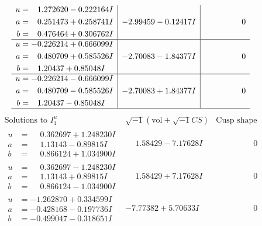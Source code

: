 \documentclass[1p]{elsarticle_modified}
\theoremstyle{definition}
\newcommand{\I}{\sqrt{-1}}
\begin{document}
$$\begin{array}{c|c|c}
\begin{aligned}
u &= \phantom{-}1.272620 - 0.222164 I \\
a &= \phantom{-}0.251473 + 0.258741 I \\
b &= \phantom{-}0.476464 + 0.306762 I\end{aligned}
 & -2.99459 - 0.12417 I & \phantom{-0.000000 } 0 \\ \hline\begin{aligned}
u &= -0.226214 + 0.666099 I \\
a &= \phantom{-}0.480709 + 0.585526 I \\
b &= \phantom{-}1.20437 + 0.85048 I\end{aligned}
 & -2.70083 - 1.84377 I & \phantom{-0.000000 } 0 \\ \hline\begin{aligned}
u &= -0.226214 - 0.666099 I \\
a &= \phantom{-}0.480709 - 0.585526 I \\
b &= \phantom{-}1.20437 - 0.85048 I\end{aligned}
 & -2.70083 + 1.84377 I & \phantom{-0.000000 } 0\\
 \hline 
 \end{array}$$\newpage$$\begin{array}{c|c|c}  
\text{Solutions to }I^u_{1}& \I (\text{vol} + \sqrt{-1}CS) & \text{Cusp shape}\\
 \hline 
\begin{aligned}
u &= \phantom{-}0.362697 + 1.248230 I \\
a &= \phantom{-}1.13143 - 0.89815 I \\
b &= \phantom{-}0.866124 + 1.034900 I\end{aligned}
 & \phantom{-}1.58429 - 7.17628 I & \phantom{-0.000000 } 0 \\ \hline\begin{aligned}
u &= \phantom{-}0.362697 - 1.248230 I \\
a &= \phantom{-}1.13143 + 0.89815 I \\
b &= \phantom{-}0.866124 - 1.034900 I\end{aligned}
 & \phantom{-}1.58429 + 7.17628 I & \phantom{-0.000000 } 0 \\ \hline\begin{aligned}
u &= -1.262870 + 0.334599 I \\
a &= -0.428168 - 0.197736 I \\
b &= -0.499047 - 0.318651 I\end{aligned}
 & -7.77382 + 5.70633 I & \phantom{-0.000000 } 0 \\ \hline\begin{aligned}

\end{aligned}
\end{array}$$
\end{document}
